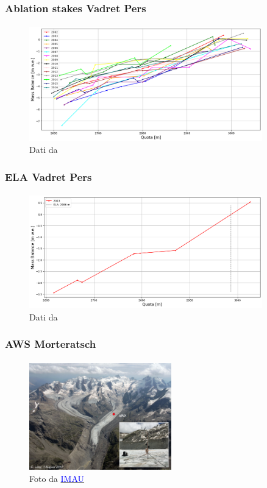 \begin{frame}
    \frametitle{Ablation stakes Vadret Pers}
    \framesubtitle{}

    \begin{figure}
        \includegraphics[width=0.9\textwidth]{Immagini/annateMassBalanceVadretPers.png}
        \caption{Dati da \cite{STAT2018}}
    \end{figure}
  
\end{frame}


\begin{frame}
    \frametitle{ELA Vadret Pers}
    \framesubtitle{}

    \begin{figure}
        \includegraphics[width=0.9\textwidth]{Immagini/elaPers.png}
        \caption{Dati da \cite{STAT2018}}
    \end{figure}
  
\end{frame}


\begin{frame}
    \frametitle{AWS Morteratsch}
    \framesubtitle{}

    \begin{figure}
        \includegraphics[width=0.55\textwidth]{Immagini/awsMorteratsch2018.png}
        \caption{Foto da \href{https://www.projects.science.uu.nl/iceclimate/aws/alpine.php}{\textcolor{blue}{IMAU}}}
    \end{figure}
  
\end{frame}


